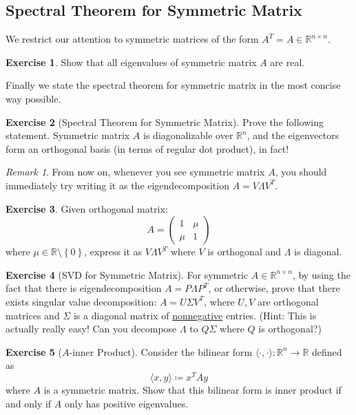 \documentclass[12pt, a4paper]{article}
\newcommand{\R}{\mathbb{R}}
\newcommand{\inner}[1]{\langle #1 \rangle}
\theoremstyle{remark}
\newtheorem{remark}{Remark}
\theoremstyle{definition}
\newtheorem{exercise}{Exercise}
\numberwithin{equation}{section}
\numberwithin{definition}{section}
\numberwithin{example}{section}
\numberwithin{exercise}{section}
\numberwithin{remark}{section}
\numberwithin{figure}{section}
\begin{document}
\subsection{Spectral Theorem for Symmetric Matrix}
We restrict our attention to symmetric matrices of the form $A^T = A \in \R^{n \times n}$.
\begin{exercise}
    Show that all eigenvalues of symmetric matrix $A$ are real.
\end{exercise}
Finally we state the spectral theorem for symmetric matrix in the most concise way possible.
\begin{exercise}[Spectral Theorem for Symmetric Matrix]
    Prove the following statement.
    Symmetric matrix $A$ is diagonalizable over $\R^n$, and the eigenvectors form an orthogonal basis (in terms of regular dot product), in fact!
\end{exercise}
\begin{remark}
    From now on, whenever you see symmetric matrix $A$, you should immediately try writing it as the eigendecomposition $A = V \Lambda V^T$.
\end{remark}
\begin{exercise}
    Given orthogonal matrix:
    \begin{equation*}
        A =
        \begin{pmatrix}
            1 & \mu \\ \mu & 1
        \end{pmatrix}
    \end{equation*}
    where $\mu \in \R \setminus \left\{ 0 \right\}$,
    express it as $V \Lambda V^T$ where $V$ is orthogonal and $\Lambda$ is diagonal.
\end{exercise}
\begin{exercise}[SVD for Symmetric Matrix]
    For symmetric $A \in \R^{n \times n}$,
    by using the fact that there is eigendecomposition $A = P \Lambda P^T$,
    or otherwise,
    prove that there exists singular value decomposition: $A = U \Sigma V^T$,
    where $U, V$ are orthogonal matrices and $\Sigma$ is a diagonal matrix of
    \underline{nonnegative} entries.
    (Hint: This is actually really easy! Can you decompose $\Lambda$ to
    $Q \Sigma$ where $Q$ is orthogonal?)
\end{exercise}
\begin{exercise}[$A$-inner Product]
    Consider the bilinear form $\inner{\cdot, \cdot}: \R^n \rightarrow \R$ defined as
    \begin{equation*}
        \inner{x, y} \coloneqq x^T A y
    \end{equation*}
    where $A$ is a symmetric matrix.
    Show that this bilinear form is inner product if and only if $A$ only has positive eigenvalues.
\end{exercise}
\end{document}
